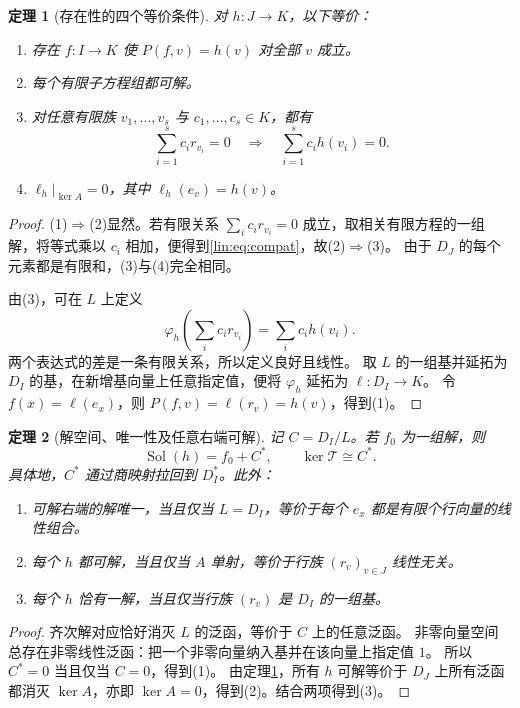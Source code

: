 \documentclass[11pt,a4paper,oneside,openany]{book}
\theoremstyle{lecture}
\newtheorem{theorem}{定理}[section]
\newcommand{\T}{\mathcal T}
\newcommand{\Sol}{\operatorname{Sol}}
\numberwithin{equation}{section}
\begin{document}
\begin{theorem}[存在性的四个等价条件]\label{lin:thm:scalar}
对 $h:J\to K$，以下等价：
\begin{enumerate}
\item 存在 $f:I\to K$ 使 $P(f,v)=h(v)$ 对全部 $v$ 成立。
\item 每个有限子方程组都可解。
\item 对任意有限族 $v_1,\ldots,v_s$ 与 $c_1,\ldots,c_s\in K$，都有
\begin{equation}\label{lin:eq:compat}
 \sum_{i=1}^s c_ir_{v_i}=0
 \quad\Longrightarrow\quad
 \sum_{i=1}^s c_ih(v_i)=0.
\end{equation}
\item $\ell_h|_{\ker A}=0$，其中 $\ell_h(e_v)=h(v)$。
\end{enumerate}
\end{theorem}
\begin{proof}
(1)$\Rightarrow$(2)显然。若有限关系 $\sum_i c_ir_{v_i}=0$ 成立，取相关有限方程的一组解，将等式乘以 $c_i$ 相加，便得到\eqref{lin:eq:compat}，故(2)$\Rightarrow$(3)。
由于 $D_J$ 的每个元素都是有限和，(3)与(4)完全相同。

由(3)，可在 $L$ 上定义
\[
 \varphi_h\!\left(\sum_i c_ir_{v_i}\right)=\sum_i c_ih(v_i).
\]
两个表达式的差是一条有限关系，所以定义良好且线性。
取 $L$ 的一组基并延拓为 $D_I$ 的基，在新增基向量上任意指定值，便将 $\varphi_h$ 延拓为 $\ell:D_I\to K$。
令 $f(x)=\ell(e_x)$，则 $P(f,v)=\ell(r_v)=h(v)$，得到(1)。
\end{proof}

\begin{theorem}[解空间、唯一性及任意右端可解]\label{lin:thm:scalarstructure}
记 $C=D_I/L$。若 $f_0$ 为一组解，则
\begin{equation}\label{lin:eq:scalarstructure}
 \Sol(h)=f_0+C^*,\qquad \ker\T\cong C^*.
\end{equation}
具体地，$C^*$ 通过商映射拉回到 $D_I^*$。此外：
\begin{enumerate}
\item 可解右端的解唯一，当且仅当 $L=D_I$，等价于每个 $e_x$ 都是有限个行向量的线性组合。
\item 每个 $h$ 都可解，当且仅当 $A$ 单射，等价于行族 $(r_v)_{v\in J}$ 线性无关。
\item 每个 $h$ 恰有一解，当且仅当行族 $(r_v)$ 是 $D_I$ 的一组基。
\end{enumerate}
\end{theorem}
\begin{proof}
齐次解对应恰好消灭 $L$ 的泛函，等价于 $C$ 上的任意泛函。
非零向量空间总存在非零线性泛函：把一个非零向量纳入基并在该向量上指定值 $1$。
所以 $C^*=0$ 当且仅当 $C=0$，得到(1)。
由定理\ref{lin:thm:scalar}，所有 $h$ 可解等价于 $D_J$ 上所有泛函都消灭 $\ker A$，亦即 $\ker A=0$，得到(2)。结合两项得到(3)。
\end{proof}
\end{document}
